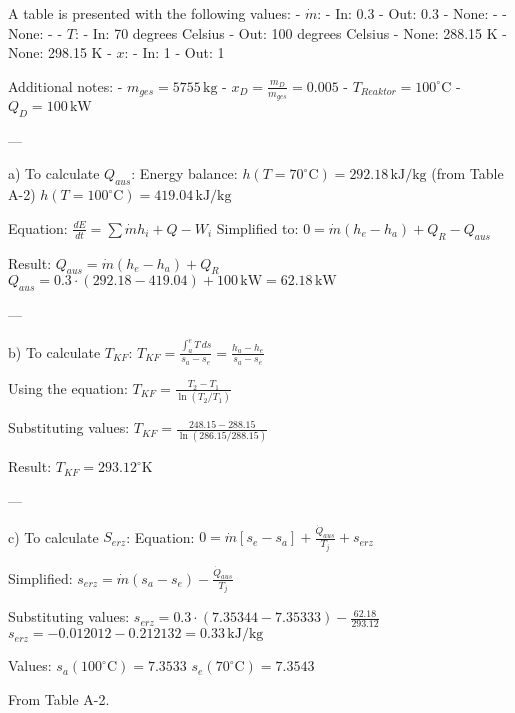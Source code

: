 A table is presented with the following values:  
- \( \dot{m} \):  
  - In: 0.3  
  - Out: 0.3  
  - None: -  
  - None: -  
- \( T \):  
  - In: 70 degrees Celsius  
  - Out: 100 degrees Celsius  
  - None: 288.15 K  
  - None: 298.15 K  
- \( x \):  
  - In: 1  
  - Out: 1  

Additional notes:  
- \( m_{ges} = 5755 \, \text{kg} \)  
- \( x_D = \frac{m_D}{m_{ges}} = 0.005 \)  
- \( T_{Reaktor} = 100^\circ \text{C} \)  
- \( Q_D = 100 \, \text{kW} \)  

---

a) To calculate \( Q_{aus} \):  
Energy balance:  
\( h(T=70^\circ \text{C}) = 292.18 \, \text{kJ/kg} \) (from Table A-2)  
\( h(T=100^\circ \text{C}) = 419.04 \, \text{kJ/kg} \)  

Equation:  
\( \frac{dE}{dt} = \sum \dot{m} h_i + Q - W_i \)  
Simplified to:  
\( 0 = \dot{m}(h_e - h_a) + Q_R - Q_{aus} \)  

Result:  
\( Q_{aus} = \dot{m}(h_e - h_a) + Q_R \)  
\( Q_{aus} = 0.3 \cdot (292.18 - 419.04) + 100 \, \text{kW} = 62.18 \, \text{kW} \)  

---

b) To calculate \( T_{KF} \):  
\( T_{KF} = \frac{\int_a^e T \, ds}{s_a - s_e} = \frac{h_a - h_e}{s_a - s_e} \)  

Using the equation:  
\( T_{KF} = \frac{T_2 - T_1}{\ln(T_2 / T_1)} \)  

Substituting values:  
\( T_{KF} = \frac{248.15 - 288.15}{\ln(286.15 / 288.15)} \)  

Result:  
\( T_{KF} = 293.12^\circ \text{K} \)  

---

c) To calculate \( S_{erz} \):  
Equation:  
\( 0 = \dot{m}[s_e - s_a] + \frac{\dot{Q}_{aus}}{T_j} + s_{erz} \)  

Simplified:  
\( s_{erz} = \dot{m}(s_a - s_e) - \frac{\dot{Q}_{aus}}{T_j} \)  

Substituting values:  
\( s_{erz} = 0.3 \cdot (7.35344 - 7.35333) - \frac{62.18}{293.12} \)  
\( s_{erz} = -0.012012 - 0.212132 = 0.33 \, \text{kJ/kg} \)  

Values:  
\( s_a(100^\circ \text{C}) = 7.3533 \)  
\( s_e(70^\circ \text{C}) = 7.3543 \)  

From Table A-2.